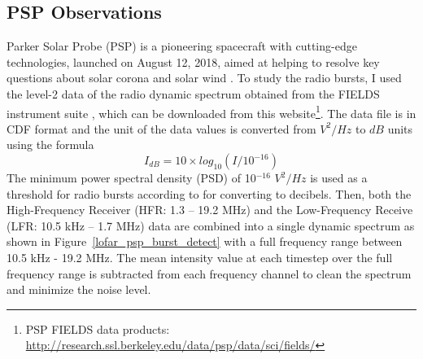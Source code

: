 \subsection{PSP Observations}
Parker Solar Probe (PSP) is a pioneering spacecraft with cutting-edge technologies, launched on August 12, 2018, aimed at helping to resolve key questions about solar corona and solar wind \citep{fox_2016}.
To study the radio bursts, I used the level-2 data of the radio dynamic spectrum obtained from the FIELDS instrument suite \citep{bale_2016, pulupa_2017}, which can be downloaded from this website\footnote{PSP FIELDS data products: \url{http://research.ssl.berkeley.edu/data/psp/data/sci/fields/}}. The data file is in CDF format and the unit of the data values is converted from $V^2/Hz$ to $dB$ units using the formula
\begin{equation}
    I_{dB} = 10 \times log_{10}(I/10^{-16})
\end{equation}
The minimum power spectral density (PSD) of 10$^{-16}$ $V^2/Hz$ is used as a threshold for radio bursts according to \citet{pulupa_2020} for converting to decibels. Then, both the High-Frequency Receiver (HFR: 1.3 – 19.2 MHz) and the Low-Frequency Receive (LFR: 10.5 kHz – 1.7 MHz) data are combined into a single dynamic spectrum as shown in Figure~\ref{lofar_psp_burst_detect} with a full frequency range between 10.5 kHz - 19.2 MHz. The mean intensity value at each timestep over the full frequency range is subtracted from each frequency channel to clean the spectrum and minimize the noise level.


